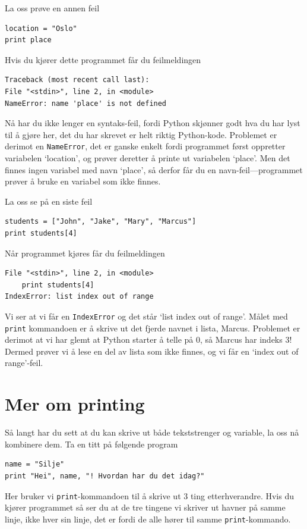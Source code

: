 \documentclass[a4paper, 11pt, notitlepage]{article}
\begin{document}
La oss prøve en annen feil
\begin{lstlisting}
location = "Oslo"
print place
\end{lstlisting}
Hvis du kjører dette programmet får du feilmeldingen
\begin{verbatim}
Traceback (most recent call last):
File "<stdin>", line 2, in <module>
NameError: name 'place' is not defined
\end{verbatim}
Nå har du ikke lenger en syntaks-feil, fordi Python skjønner godt hva du har lyst til å gjøre her, det du har skrevet er helt riktig Python-kode. Problemet er derimot en \verb+NameError+, det er ganske enkelt fordi programmet først oppretter variabelen `location', og prøver deretter å printe ut variabelen `place'. Men det finnes ingen variabel med navn `place', så derfor får du en navn-feil---programmet prøver å bruke en variabel som ikke finnes.

La oss se på en siste feil
\begin{lstlisting}
students = ["John", "Jake", "Mary", "Marcus"]
print students[4]
\end{lstlisting}
Når programmet kjøres får du feilmeldingen
\begin{verbatim}
File "<stdin>", line 2, in <module>
    print students[4]
IndexError: list index out of range
\end{verbatim}
Vi ser at vi får en \verb+IndexError+ og det står `list index out of range'. Målet med \verb+print+ kommandoen er å skrive ut det fjerde navnet i lista, Marcus. Problemet er derimot at vi har glemt at Python starter å telle på 0, så Marcus har indeks 3! Dermed prøver vi å lese en del av lista som ikke finnes, og vi får en `index out of range'-feil.

\section*{Mer om printing}

Så langt har du sett at du kan skrive ut både tekststrenger og variable, la oss nå kombinere dem. Ta en titt på følgende program
\begin{lstlisting}
name = "Silje"
print "Hei", name, "! Hvordan har du det idag?"
\end{lstlisting}
Her bruker vi \verb+print+-kommandoen til å skrive ut 3 ting etterhverandre. Hvis du kjører programmet så ser du at de tre tingene vi skriver ut havner på samme linje, ikke hver sin linje, det er fordi de alle hører til samme \verb+print+-kommando.
\end{document}
